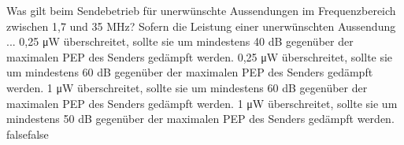     {Was gilt beim Sendebetrieb für unerwünschte Aussendungen im Frequenzbereich zwischen 1,7 und 35 MHz? Sofern die Leistung einer unerwünschten Aussendung ...}
    {0,25 μW überschreitet, sollte sie um mindestens 40 dB gegenüber der maximalen PEP des Senders gedämpft werden.}
    {0,25 μW überschreitet, sollte sie um mindestens 60 dB gegenüber der maximalen PEP des Senders gedämpft werden.}
    {1 μW überschreitet, sollte sie um mindestens 60 dB gegenüber der maximalen PEP des Senders gedämpft werden.}
    {1 μW überschreitet, sollte sie um mindestens 50 dB gegenüber der maximalen PEP des Senders gedämpft werden.}
    {false}{false}